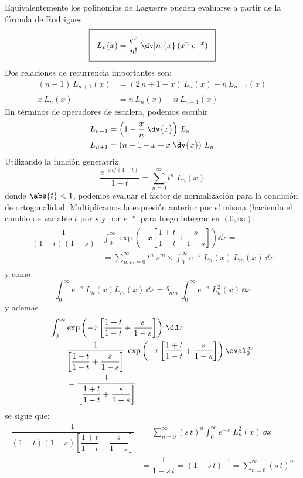 Equivalentemente los polinomios de Laguerre pueden evaluarse a partir de la fórmula de Rodrigues
\begin{align*}
\setlength{\fboxsep}{3\fboxsep}\boxed{ L_{n}(x) = \dfrac{e^{x}}{n!} \; \dv[n]{x} \, (x^{n} \; e^{-x}) }
\end{align*}
Dos relaciones de recurrencia importantes son:
\begin{align*}
(n + 1) \, L_{n + 1}(x) &= (2 \, n + 1 - x) \, L_{n}(x) - n \, L_{n-1}(x) \\
x \, \dot{L}_{n}(x) &= n \, L_{n}(x) - n \, L_{n - 1}(x)
\end{align*}
En términos de operadores de escalera, podemos escribir
\begin{align*}
L_{n - 1} &= \left( 1 - \dfrac{x}{n} \; \dv{x} \right) \, L_{n} \\
L_{n + 1} &= \left( n + 1 - x + x \; \dv{x} \right) \, L_{n}
\end{align*}
Utilizando la función generatriz
\[ \dfrac{e^{-x t/(1 - t)}}{1 - t} = \sum_{n=0}^{\infty} t^{n} \; L_{n}(x) \]
donde $\abs{t} < 1$, podemos evaluar el factor de normalización para la condición de ortogonalidad. Multiplicamos la expresión anterior por sí misma (haciendo el cambio de variable $t$ por $s$ y por $e^{-x}$, para luego integrar en $(0, \infty)$:
\begin{align}
\begin{aligned}
\dfrac{1}{(1 - t)(1 - s)} &\int_{0}^{\infty} \exp \left( -x \left[ \dfrac{1+t}{1-t} + \dfrac{s}{1-s} \right] \right) \dd x =  \\
&= \sum_{n, m = 0}^{\infty} t^{n} \; s^{m} \times \int_{0}^{\infty} e^{-x} \; L_{n}(x) \, L_{m}(x) \, \dd x
\end{aligned}
\label{eq:ecuacion_08_77}
\end{align}
y como
\[ \int_{0}^{\infty} e^{-x} \; L_{n}(x) L_{m}(x) \, \dd x = \delta_{nm} \; \int_{0}^{\infty} e^{-x} \; L_{n}^{2} (x) \, \dd x \]
y además
\begin{align*}
\int_{0}^{\infty} &\exp \left( -x \left[ \dfrac{1 + t}{1 - t} + \dfrac{s}{1 - s} \right] \right) \, \dd x = \\
&\dfrac{1}{\left[ \dfrac{1 + t}{1 - t} + \dfrac{s}{1 - s} \right]} \, \exp \left( -x \left[ \dfrac{1 + t}{1 - t} + \dfrac{s}{1 - s} \right] \right) \eval_{0}^{\infty} \\
&= \dfrac{1}{\left[ \dfrac{1 + t}{1 - t} + \dfrac{s}{1 - s} \right]}
\end{align*}
se sigue que:
\begin{align*}
\dfrac{1}{(1-t)(1 - s) \left[ \dfrac{1 + t}{1 - t} + \dfrac{s}{1 - s} \right]} &= \sum_{n=0}^{\infty} (s \, t)^{n} \int_{0}^{\infty} e^{-x} \; L_{n}^{2} (x) \, \dd x \\
&= \dfrac{1}{1 - s \, t} = (1 - s \, t)^{-1} = \sum_{n=0}^{\infty} (s \, t)^{n}
\end{align*}
